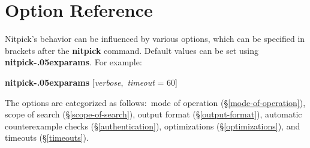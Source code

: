 \documentclass[a4paper,12pt]{article}
\renewcommand\_{\hbox{\textunderscore\kern-.05ex}}
\begin{document}
\section{Option Reference}
\label{option-reference}

\def\defl{\{}
\def\defr{\}}

\def\flushitem#1{\item[]\noindent\kern-\leftmargin \textbf{#1}}
\def\qty#1{$\left<\textit{#1}\right>$}
\def\qtybf#1{$\mathbf{\left<\textbf{\textit{#1}}\right>}$}
\def\optrue#1#2{\flushitem{\textit{#1} $\bigl[$= \qtybf{bool}$\bigr]$\enskip \defl\textit{true}\defr\hfill (neg.: \textit{#2})}\nopagebreak\\[\parskip]}
\def\opfalse#1#2{\flushitem{\textit{#1} $\bigl[$= \qtybf{bool}$\bigr]$\enskip \defl\textit{false}\defr\hfill (neg.: \textit{#2})}\nopagebreak\\[\parskip]}
\def\opsmart#1#2{\flushitem{\textit{#1} $\bigl[$= \qtybf{smart\_bool}$\bigr]$\enskip \defl\textit{smart}\defr\hfill (neg.: \textit{#2})}\nopagebreak\\[\parskip]}
\def\opnodefault#1#2{\flushitem{\textit{#1} = \qtybf{#2}} \nopagebreak\\[\parskip]}
\def\opdefault#1#2#3{\flushitem{\textit{#1} = \qtybf{#2}\enskip \defl\textit{#3}\defr} \nopagebreak\\[\parskip]}
\def\oparg#1#2#3{\flushitem{\textit{#1} \qtybf{#2} = \qtybf{#3}} \nopagebreak\\[\parskip]}
\def\opargbool#1#2#3{\flushitem{\textit{#1} \qtybf{#2} $\bigl[$= \qtybf{bool}$\bigr]$\hfill (neg.: \textit{#3})}\nopagebreak\\[\parskip]}
\def\opargboolorsmart#1#2#3{\flushitem{\textit{#1} \qtybf{#2} $\bigl[$= \qtybf{smart\_bool}$\bigr]$\hfill (neg.: \textit{#3})}\nopagebreak\\[\parskip]}

Nitpick's behavior can be influenced by various options, which can be specified
in brackets after the \textbf{nitpick} command. Default values can be set
using \textbf{nitpick\_\allowbreak params}. For example:

\prew
\textbf{nitpick\_params} [\textit{verbose}, \,\textit{timeout} = 60]
\postw

The options are categorized as follows:\ mode of operation
(\S\ref{mode-of-operation}), scope of search (\S\ref{scope-of-search}), output
format (\S\ref{output-format}), automatic counterexample checks
(\S\ref{authentication}), optimizations
(\S\ref{optimizations}), and timeouts (\S\ref{timeouts}).
\end{document}
